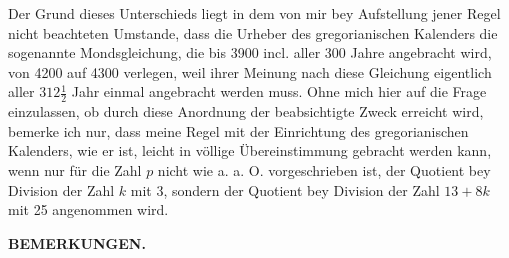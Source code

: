 Der Grund dieses Unterschieds liegt in dem von mir bey Aufstellung jener Regel nicht beachteten Umstande, dass die Urheber des gregorianischen Kalenders die sogenannte Mondsgleichung, die bis 3900 incl. aller 300 Jahre angebracht wird, von 4200 auf 4300 verlegen, weil ihrer Meinung nach diese Gleichung eigentlich aller $312\frac12$ Jahr einmal angebracht werden muss. Ohne mich hier auf die Frage einzulassen, ob durch diese Anordnung der beabsichtigte Zweck erreicht wird, bemerke ich nur, dass meine Regel mit der Einrichtung des gregorianischen Kalenders, wie er ist, leicht in völlige Übereinstimmung gebracht werden kann, wenn nur für die Zahl $p$ nicht wie a. a. O. vorgeschrieben ist, der Quotient bey Division der Zahl $k$ mit 3, sondern der Quotient bey Division der Zahl $13+8k$ mit 25 angenommen wird.
\clearpage{}
\begin{center}\textbf{BEMERKUNGEN.}\end{center}
\begingroup\small
